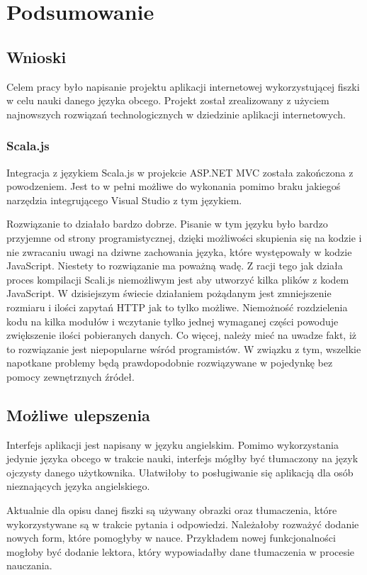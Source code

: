 \newpage
{\let\cleardoublepage\relax \chapter{Podsumowanie}}
\label{cha:summary}

\section{Wnioski}

Celem pracy było napisanie projektu aplikacji internetowej wykorzystującej fiszki w celu nauki danego języka obcego. Projekt został zrealizowany z użyciem najnowszych rozwiązań technologicznych w dziedzinie aplikacji internetowych. 



 
\subsection{Scala.js}

Integracja z językiem Scala.js w projekcie ASP.NET MVC została zakończona z powodzeniem. Jest to w pełni możliwe do wykonania pomimo braku jakiegoś narzędzia integrującego Visual Studio z tym językiem. 

Rozwiązanie to działało bardzo dobrze. Pisanie w tym języku było bardzo przyjemne od strony programistycznej, dzięki możliwości skupienia się na kodzie i nie zwracaniu uwagi na dziwne zachowania języka, które występowały w kodzie JavaScript.
Niestety to rozwiązanie ma poważną wadę. Z racji tego jak działa proces kompilacji Scali.js niemożliwym jest aby utworzyć kilka plików z kodem JavaScript. W dzisiejszym świecie działaniem pożądanym jest zmniejszenie rozmiaru i ilości zapytań HTTP jak to tylko możliwe. Niemożność rozdzielenia kodu na kilka modułów i wczytanie tylko jednej wymaganej części powoduje zwiększenie ilości pobieranych danych.
Co więcej, należy mieć na uwadze fakt, iż to rozwiązanie jest niepopularne wśród programistów. W związku z tym, wszelkie napotkane problemy będą prawdopodobnie rozwiązywane w pojedynkę bez pomocy zewnętrznych źródeł.

\section{Możliwe ulepszenia}

Interfejs aplikacji jest napisany w języku angielskim. Pomimo wykorzystania jedynie języka obcego w trakcie nauki, interfejs mógłby być tłumaczony na język ojczysty danego użytkownika. Ułatwiłoby to posługiwanie się aplikacją dla osób nieznających języka angielskiego.

Aktualnie dla opisu danej fiszki są używany obrazki oraz tłumaczenia, które wykorzystywane są w trakcie pytania i odpowiedzi. Należałoby rozważyć dodanie nowych form, które pomogłyby w nauce. Przykładem nowej funkcjonalności mogłoby być dodanie lektora, który wypowiadałby dane tłumaczenia w procesie nauczania.
